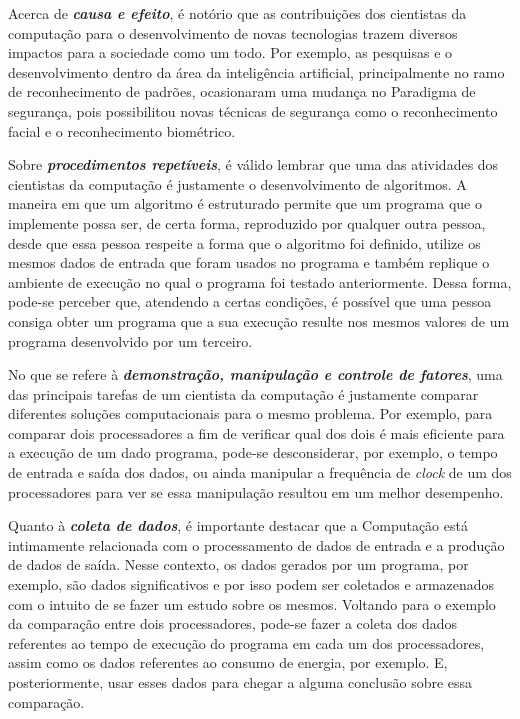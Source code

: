 Acerca de \textbf{\textit{causa e efeito}}, é notório que as contribuições dos cientistas da computação para o desenvolvimento de novas tecnologias trazem diversos impactos para a sociedade como um todo. Por exemplo, as pesquisas e o desenvolvimento dentro da área da inteligência artificial, principalmente no ramo de reconhecimento de padrões, ocasionaram uma mudança no \gls{Paradigma} de segurança, pois possibilitou novas técnicas de segurança como o reconhecimento facial e o reconhecimento biométrico.

Sobre \textbf{\textit{procedimentos repetíveis}}, é válido lembrar que uma das atividades dos cientistas da computação é justamente o desenvolvimento de algoritmos. A maneira em que um algoritmo é estruturado permite que um programa que o implemente possa ser, de certa forma, reproduzido por qualquer outra pessoa, desde que essa pessoa respeite a forma que o algoritmo foi definido, utilize os mesmos dados de entrada que foram usados no programa e também replique o ambiente de execução no qual o programa foi testado anteriormente. Dessa forma, pode-se perceber que, atendendo a certas condições, é possível que uma pessoa consiga obter um programa que a sua execução resulte nos mesmos valores de um programa desenvolvido por um terceiro.

No que se refere à \textbf{\textit{demonstração, manipulação e controle de fatores}}, uma das principais tarefas de um cientista da computação é justamente comparar diferentes soluções computacionais para o mesmo problema. Por exemplo, para comparar dois processadores a fim de verificar qual dos dois é mais eficiente para a execução de um dado programa, pode-se desconsiderar, por exemplo, o tempo de entrada e saída dos dados, ou ainda manipular a frequência de \textit{clock} de um dos processadores para ver se essa manipulação resultou em um melhor desempenho.

Quanto à \textbf{\textit{coleta de dados}}, é importante destacar que a Computação está intimamente relacionada com o processamento de dados de entrada e a produção de dados de saída. Nesse contexto, os dados gerados por um programa, por exemplo, são dados significativos e por isso podem ser coletados e armazenados com o intuito de se fazer um estudo sobre os mesmos. Voltando para o exemplo da comparação entre dois processadores, pode-se fazer a coleta dos dados referentes ao tempo de execução do programa em cada um dos processadores, assim como os dados referentes ao consumo de energia, por exemplo. E, posteriormente, usar esses dados para chegar a alguma conclusão sobre essa comparação.

